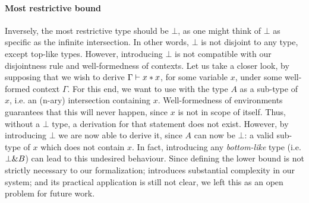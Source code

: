 \paragraph{Most restrictive bound}
Inversely, the most restrictive type should be $\bot$, as one might think of $\bot$ as specific 
as the infinite intersection.
In other words, $\bot$ is not disjoint to any type, except top-like types.
However, introducing $\bot$ is not compatible with our disjointness rule
 and well-formedness of contexts.
Let us take a closer look, by supposing that we wish to derive $\Gamma \vdash x * x$, for some variable 
$x$, under some well-formed context $\Gamma$.
For this end, we want to use  with the type $A$ as a sub-type of $x$, 
i.e. an (n-ary) intersection containing $x$.
Well-formedness of environments guarantees that this will never happen, since $x$ is not in
scope of itself. 
Thus, without a $\bot$ type, a derivation for that statement does not exist. 
However, by introducing $\bot$ we are now able to derive it, since $A$ can now be $\bot$: a valid
sub-type of $x$ which does not contain $x$.
In fact, introducing any \emph{bottom-like} type (i.e. $\bot \& B$) can lead to this
undesired behaviour.
Since defining the lower bound is not strictly necessary to our formalization; introduces 
substantial complexity in our system; and its practical application is still not clear, we left this
as an open problem for future work. 

